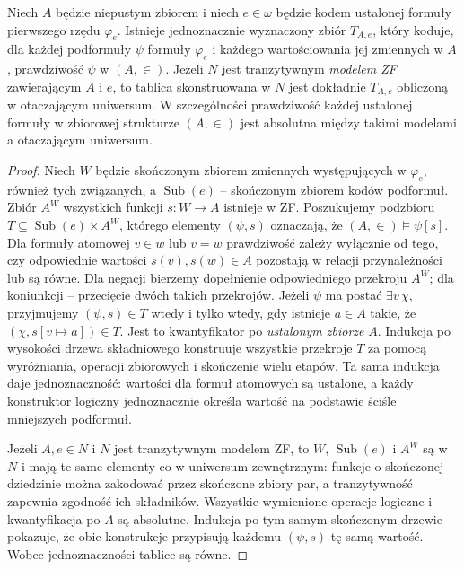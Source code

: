\begin{lemat}
\label{lem:l-satisfaction-table-transitive-73}
Niech $A$ będzie niepustym zbiorem i niech $e\in\omega$
będzie kodem ustalonej formuły pierwszego rzędu $\varphi_e$.
Istnieje jednoznacznie wyznaczony zbiór $T_{A,e}$,
który koduje, dla każdej podformuły $\psi$ formuły
$\varphi_e$ i każdego wartościowania jej zmiennych
w $A$, prawdziwość $\psi$ w $(A,\in)$.
Jeżeli $N$ jest tranzytywnym \emph{modelem ZF}
zawierającym $A$ i $e$, to tablica skonstruowana w $N$
jest dokładnie $T_{A,e}$ obliczoną w otaczającym uniwersum.
W szczególności prawdziwość każdej ustalonej formuły
w zbiorowej strukturze $(A,\in)$ jest absolutna między
takimi modelami a otaczającym uniwersum.
\end{lemat}
\begin{proof}
Niech $W$ będzie skończonym zbiorem zmiennych występujących
w $\varphi_e$, również tych związanych, a $\operatorname{Sub}(e)$
-- skończonym zbiorem kodów podformuł. Zbiór
$A^W$ wszystkich funkcji $s:W\to A$ istnieje w ZF.
Poszukujemy podzbioru
$T\subseteq\operatorname{Sub}(e)\times A^W$,
którego elementy $(\psi,s)$ oznaczają, że
$(A,\in)\models\psi[s]$.
Dla formuły atomowej $v\in w$ lub $v=w$ prawdziwość
zależy wyłącznie od tego, czy odpowiednie wartości
$s(v),s(w)\in A$ pozostają w relacji przynależności
lub są równe. Dla negacji bierzemy dopełnienie
odpowiedniego przekroju $A^W$; dla koniunkcji
-- przecięcie dwóch takich przekrojów. Jeżeli
$\psi$ ma postać $\exists v\,\chi$, przyjmujemy
$(\psi,s)\in T$ wtedy i tylko wtedy, gdy istnieje
$a\in A$ takie, że $(\chi,s[v\mapsto a])\in T$.
Jest to kwantyfikator po \emph{ustalonym zbiorze} $A$.
Indukcja po wysokości drzewa składniowego konstruuje
wszystkie przekroje $T$ za pomocą wyróżniania,
operacji zbiorowych i skończenie wielu etapów.
Ta sama indukcja daje jednoznaczność: wartości dla
formuł atomowych są ustalone, a każdy konstruktor
logiczny jednoznacznie określa wartość na podstawie
ściśle mniejszych podformuł.

Jeżeli $A,e\in N$ i $N$ jest tranzytywnym modelem ZF,
to $W$, $\operatorname{Sub}(e)$ i $A^W$ są w $N$
i mają te same elementy co w uniwersum zewnętrznym:
funkcje o skończonej dziedzinie można zakodować przez
skończone zbiory par, a tranzytywność zapewnia
zgodność ich składników. Wszystkie wymienione
operacje logiczne i kwantyfikacja po $A$ są absolutne.
Indukcja po tym samym skończonym drzewie pokazuje,
że obie konstrukcje przypisują każdemu $(\psi,s)$
tę samą wartość. Wobec jednoznaczności tablice są równe.
\end{proof}
